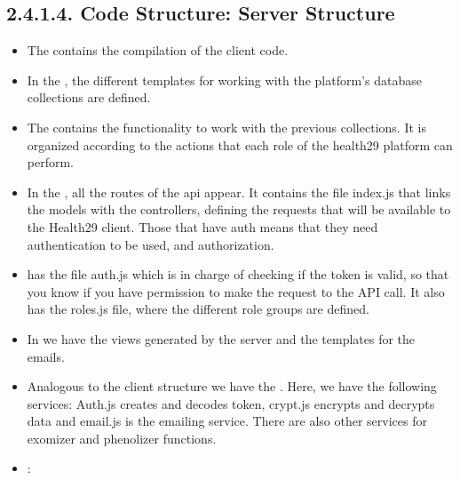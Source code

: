 \documentclass[letterpaper,10pt,english]{sphinxmanual}
\begin{document}
\subsection{2.4.1.4. Code Structure: Server Structure}
\label{\detokenize{pages/SW/Code:code-structure-server-structure}}

\begin{itemize}
\item {} 
The  contains the compilation of the client code.

\item {} 
In the , the different templates for working with the platform’s database collections are defined.

\item {} 
The  contains the functionality to work with the previous collections. It is organized according to the actions that each role of the health29 platform can perform.

\item {} 
In the , all the routes of the api appear. It contains the file index.js that links the models with the controllers, defining the requests that will be available to the Health29 client. Those that have auth means that they need authentication to be used, and authorization.

\item {} 
 has the file auth.js which is in charge of checking if the token is valid, so that you know if you have permission to make the request to the API call. It also has the roles.js file, where the different role groups are defined.

\item {} 
In  we have the views generated by the server and the templates for the emails.

\item {} 
Analogous to the client structure we have the . Here, we have the following services: Auth.js creates and decodes token, crypt.js encrypts and decrypts data and email.js is the emailing service. There are also other services for exomizer and phenolizer functions.

\item {} 
:

\end{itemize}
\end{document}
